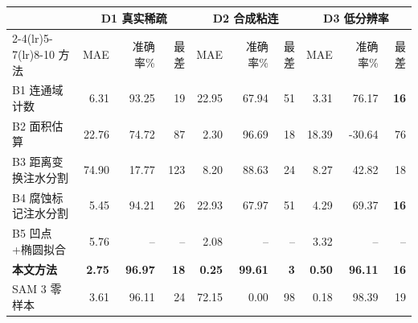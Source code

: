 \setlength{\tabcolsep}{4pt}
\begin{tabular}{lrrrrrrrrr}
\toprule
& \multicolumn{3}{c}{D1 真实稀疏} & \multicolumn{3}{c}{D2 合成粘连} & \multicolumn{3}{c}{D3 低分辨率} \\
\cmidrule(lr){2-4}\cmidrule(lr){5-7}\cmidrule(lr){8-10}
方法 & MAE & 准确率\% & 最差 & MAE & 准确率\% & 最差 & MAE & 准确率\% & 最差 \\
\midrule
B1 连通域计数 & 6.31 & 93.25 & 19 & 22.95 & 67.94 & 51 & 3.31 & 76.17 & \textbf{16} \\
B2 面积估算 & 22.76 & 74.72 & 87 & 2.30 & 96.69 & 18 & 18.39 & -30.64 & 76 \\
B3 距离变换注水分割 & 74.90 & 17.77 & 123 & 8.20 & 88.63 & 24 & 8.27 & 42.82 & 18 \\
B4 腐蚀标记注水分割 \cite{kurade2023} & 5.45 & 94.21 & 26 & 22.93 & 67.97 & 51 & 4.29 & 69.37 & \textbf{16} \\
B5 凹点+椭圆拟合 \cite{avzalov2025} & 5.76 & -- & -- & 2.08 & -- & -- & 3.32 & -- & -- \\
\textbf{本文方法} & \textbf{2.75} & \textbf{96.97} & \textbf{18} & \textbf{0.25} & \textbf{99.61} & \textbf{3} & \textbf{0.50} & \textbf{96.11} & \textbf{16} \\
\midrule
SAM 3 零样本 & 3.61 & 96.11 & 24 & 72.15 & 0.00 & 98 & 0.18 & 98.39 & 19 \\
\bottomrule
\end{tabular}